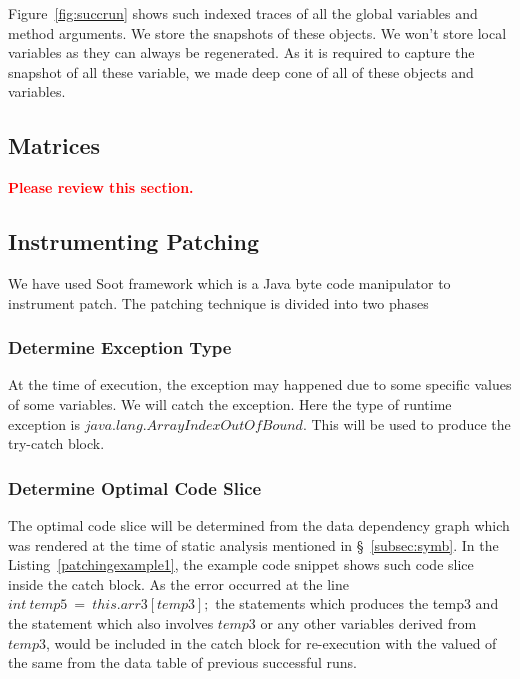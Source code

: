 Figure~\ref{fig:succrun} shows such indexed traces of all the global variables
and method arguments.
We store the snapshots of these objects. We won't store local variables as they
can always be regenerated.
As it is required to capture the snapshot of all these variable, we made deep
cone of all of these objects and variables.



\subsection{Matrices}
\label{subsec:martices}

\textcolor{red}{\textbf{Please review this section.}}\newline

\subsection{Instrumenting Patching}
\label{subsec:patchinstru}

We have used Soot framework which is a Java byte code manipulator to instrument
patch. 
The patching technique is divided into two phases

\subsubsection{Determine Exception Type} 

At the time of execution, the exception may happened due to some specific values
of some variables. We will catch the exception. Here the type of runtime
exception is $java.lang.ArrayIndexOutOfBound$. This will be used to produce the
try-catch block.
 
\subsubsection{Determine Optimal Code Slice}

The optimal code slice will be determined from the data dependency graph which
was rendered at the time of static analysis mentioned in
\S~\ref{subsec:symb}. In the Listing~\ref{patchingexample1}, the example
code snippet shows such code slice inside the catch block.
As the error occurred at the line $int\ temp5\ =\ this.arr3[temp3];$ the
statements which produces the temp3 and the statement which also involves
$temp3$ or any other variables derived from $temp3$, would be included in the
catch block for re-execution with the valued of the same from the data table of
previous successful runs.

